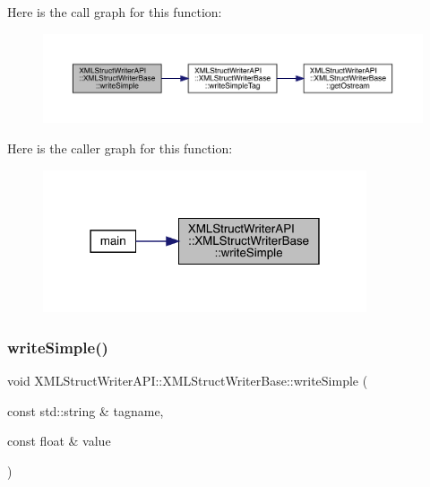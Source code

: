 Here is the call graph for this function\+:
\nopagebreak
\begin{figure}[H]
\begin{center}
\leavevmode
\includegraphics[width=350pt]{db/d4f/classXMLStructWriterAPI_1_1XMLStructWriterBase_a53065b03f0749669f9ed62f6e0875fa4_cgraph}
\end{center}
\end{figure}
Here is the caller graph for this function\+:\nopagebreak
\begin{figure}[H]
\begin{center}
\leavevmode
\includegraphics[width=271pt]{db/d4f/classXMLStructWriterAPI_1_1XMLStructWriterBase_a53065b03f0749669f9ed62f6e0875fa4_icgraph}
\end{center}
\end{figure}
\mbox{\label{classXMLStructWriterAPI_1_1XMLStructWriterBase_a521a493ac0656d33d06f4bb74286de6c}} 
\subsubsection{\texorpdfstring{writeSimple()}{writeSimple()}\hspace{0.1cm}{\footnotesize\ttfamily [3/8]}}
{\footnotesize\ttfamily void X\+M\+L\+Struct\+Writer\+A\+P\+I\+::\+X\+M\+L\+Struct\+Writer\+Base\+::write\+Simple (\begin{DoxyParamCaption}\item[{const std\+::string \&}]{tagname,  }\item[{const float \&}]{value }\end{DoxyParamCaption})\hspace{0.3cm}{\ttfamily [inline]}}

